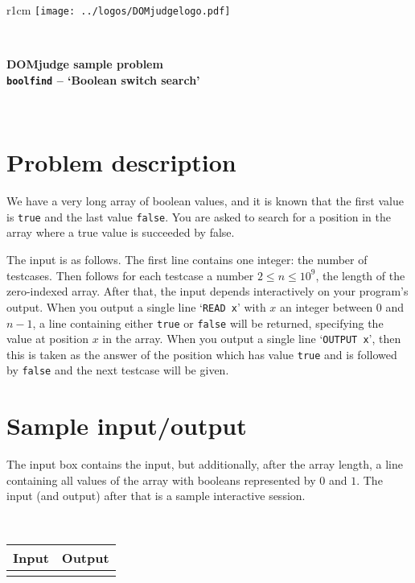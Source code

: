\documentclass[a4paper,12pt]{article}
\begin{document}
\begin{wrapfigure}[1]{r}{1cm}
  \texttt{[image: ../logos/DOMjudgelogo.pdf]}
\end{wrapfigure}
~\\
\begin{center}
  \Large\bf \textsc{DOM}judge sample problem\\
  \texttt{boolfind} -- `Boolean switch search'
\end{center}
~\\

\section*{Problem description}

We have a very long array of boolean values, and it is known that the
first value is \verb!true! and the last value \verb!false!. You
are asked to search for a position in the array where a true value
is succeeded by false.

The input is as follows. The first line contains one integer: the
number of testcases. Then follows for each testcase a number
$2 \le n \le 10^9$, the length of the zero-indexed array. After that,
the input depends interactively on your program's output. When you
output a single line `\verb!READ x!' with $x$ an integer between $0$ and
$n-1$, a line containing either \verb!true! or \verb!false! will be
returned, specifying the value at position $x$ in the array. When you
output a single line `\verb!OUTPUT x!', then this is taken as the answer
of the position which has value \verb!true! and is followed by
\verb!false! and the next testcase will be given.

\section*{Sample input/output}

The input box contains the input, but additionally, after the array
length, a line containing all values of the array with booleans
represented by $0$ and $1$. The input (and output) after that is a
sample interactive session.

~\\
\begin{tabular}{|p{}|p{}|}
\hline
\textbf{Input} & \textbf{Output} \\
\hline
 &
 \\
\hline
\end{tabular}
\end{document}
